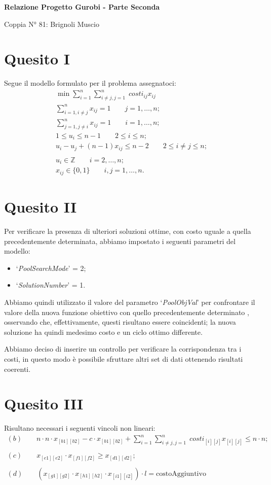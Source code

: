 \documentclass[12pt]{article}
\begin{document}
\begin{center}
	\Large\textbf{Relazione Progetto Gurobi - Parte Seconda}

	\small Coppia N° 81: Brignoli Muscio
\end{center}

\section*{Quesito I}
Segue il modello formulato per il problema assegnatoci:
\begin{gather*}
	\min\sum_{i=1}^n \sum_{i\neq j,j=1}^n\; costi_{ij}x_{ij}\\
	\sum_{i=1,i\neq j}^n x_{ij}=1\qquad j=1,\dots,n;\\
	\sum_{j=1,j\neq i}^n x_{ij}=1\qquad i=1,\dots,n;\\
	1\leq u_i\leq n-1\qquad 2\leq i\leq n;\\
	u_i-u_j+(n-1)x_{ij}\leq n-2\qquad 2\leq i\neq j\leq n;\\\\
	u_i\in\mathbb{Z}\qquad i=2,\dots,n;\\
	x_{ij}\in\{0,1\}\qquad i,j=1,\dots,n.
\end{gather*}

\section*{Quesito II}
Per verificare la presenza di ulteriori soluzioni ottime, con costo uguale a quella precedentemente determinata, abbiamo impostato i seguenti parametri del modello:
\begin{itemize}
	\item `\textit{PoolSearchMode}' = 2;
	\item `\textit{SolutionNumber}' = 1.
\end{itemize}

Abbiamo quindi utilizzato il valore del parametro `\textit{PoolObjVal}' per confrontare il valore della nuova funzione obiettivo con quello precedentemente determinato , osservando che, effettivamente, questi risultano essere coincidenti; la nuova soluzione ha quindi medesimo costo e un ciclo ottimo differente.

Abbiamo deciso di inserire un controllo per verificare la corrispondenza tra i costi, in questo modo è possibile sfruttare altri set di dati ottenendo risultati coerenti.

\section*{Quesito III}
Risultano necessari i seguenti vincoli non lineari:
\begin{gather*}
	(b)\qquad n\cdot n\cdot x_{[b1][b2]}-c\cdot x_{[b1][b2]}+\sum_{i=1}^n \sum_{i\neq j,j=1}^n\;costi_{[i][j]}x_{[i][j]}\leq n\cdot n;\\\\
	(c)\qquad x_{[e1][e2]}\cdot x_{[f1][f2]}\geq x_{[d1][d2]};\\\\
	(d)\qquad \left(x_{[g1][g2]}\cdot x_{[h1][h2]}\cdot x_{[i1][i2]}\right)\cdot l=\text{costoAggiuntivo}
\end{gather*}
\end{document}
